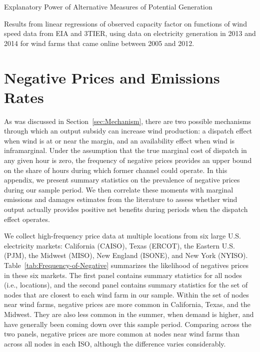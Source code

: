 \documentclass[12pt]{article}
\begin{document}
\begin{table}[H]
\caption{Explanatory Power of Alternative Measures of Potential Generation \label{tab:wind_selection}}
\footnotesize
\begin{center}

\end{center}
Results from linear regressions of observed capacity factor on functions of wind speed data from EIA and 3TIER, using data on electricity generation in 2013 and 2014 for wind farms that came online between 2005 and 2012.
\end{table}



\clearpage
\section{Negative Prices and Emissions Rates \label{Appendix:NegativePrices}}

As was discussed in Section~\ref{sec:Mechanism}, there are two possible mechanisms through which an output subsidy can increase wind production: a dispatch effect when wind is at or near the margin, and an availability effect when wind is inframarginal. Under the assumption that the true marginal cost of dispatch in any given hour is zero, the frequency of negative prices provides an upper bound on the share of hours during which former channel could operate. In this appendix, we present summary statistics on the prevalence of negative prices during our sample period. We then correlate these moments with marginal emissions and damages estimates from the literature to assess whether wind output actually provides positive net benefits during periods when the dispatch effect operates. 

We collect high-frequency price data at multiple locations from six large U.S. electricity markets: California (CAISO), Texas (ERCOT), the Eastern U.S. (PJM), the Midwest (MISO), New England (ISONE), and New York (NYISO). Table~\ref{tab:Frequency-of-Negative} summarizes the likelihood of negatives prices in these six markets. The first panel contains summary statistics for all nodes (i.e., locations), and the second panel contains summary statistics for the set of nodes that are closest to each wind farm in our sample. Within the set of nodes near wind farms, negative prices are more common in California, Texas, and the Midwest. They are also less common in the summer, when demand is higher, and have generally been coming down over this sample period. Comparing across the two panels, negative prices are more common at nodes near wind farms than across all nodes in each ISO, although the difference varies considerably.
\end{document}
